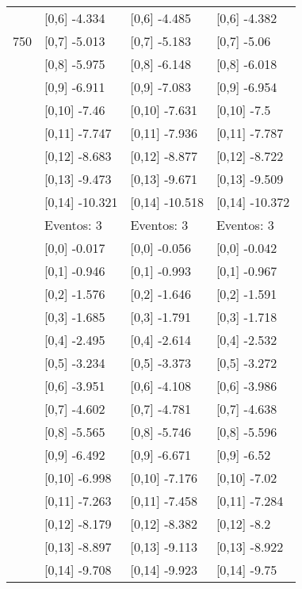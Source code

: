 \begin{table}
\begin{tabular}[t]{llll}
 & {}[0,6] -4.334 & {}[0,6] -4.485 & {}[0,6] -4.382\\
750 & {}[0,7] -5.013 & {}[0,7] -5.183 & {}[0,7] -5.06\\
\addlinespace
 & {}[0,8] -5.975 & {}[0,8] -6.148 & {}[0,8] -6.018\\
 & {}[0,9] -6.911 & {}[0,9] -7.083 & {}[0,9] -6.954\\
 & {}[0,10] -7.46 & {}[0,10] -7.631 & {}[0,10] -7.5\\
 & {}[0,11] -7.747 & {}[0,11] -7.936 & {}[0,11] -7.787\\
 & {}[0,12] -8.683 & {}[0,12] -8.877 & {}[0,12] -8.722\\
\addlinespace
 & {}[0,13] -9.473 & {}[0,13] -9.671 & {}[0,13] -9.509\\
 & {}[0,14] -10.321 & {}[0,14] -10.518 & {}[0,14] -10.372\\
 & Eventos:  3 & Eventos:  3 & Eventos:  3\\
 & {}[0,0] -0.017 & {}[0,0] -0.056 & {}[0,0] -0.042\\
 & {}[0,1] -0.946 & {}[0,1] -0.993 & {}[0,1] -0.967\\
\addlinespace
 & {}[0,2] -1.576 & {}[0,2] -1.646 & {}[0,2] -1.591\\
 & {}[0,3] -1.685 & {}[0,3] -1.791 & {}[0,3] -1.718\\
 & {}[0,4] -2.495 & {}[0,4] -2.614 & {}[0,4] -2.532\\
 & {}[0,5] -3.234 & {}[0,5] -3.373 & {}[0,5] -3.272\\
 & {}[0,6] -3.951 & {}[0,6] -4.108 & {}[0,6] -3.986\\
\addlinespace
1000 & {}[0,7] -4.602 & {}[0,7] -4.781 & {}[0,7] -4.638\\
 & {}[0,8] -5.565 & {}[0,8] -5.746 & {}[0,8] -5.596\\
 & {}[0,9] -6.492 & {}[0,9] -6.671 & {}[0,9] -6.52\\
 & {}[0,10] -6.998 & {}[0,10] -7.176 & {}[0,10] -7.02\\
 & {}[0,11] -7.263 & {}[0,11] -7.458 & {}[0,11] -7.284\\
\addlinespace
 & {}[0,12] -8.179 & {}[0,12] -8.382 & {}[0,12] -8.2\\
 & {}[0,13] -8.897 & {}[0,13] -9.113 & {}[0,13] -8.922\\
 & {}[0,14] -9.708 & {}[0,14] -9.923 & {}[0,14] -9.75\\
\bottomrule
\end{tabular}
\end{table}
